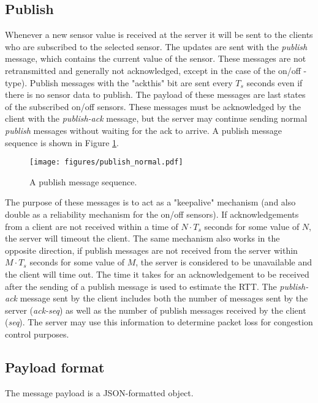 \documentclass[a4paper]{article}
\begin{document}
\subsection{Publish}
Whenever a new sensor value is received at the server it will be sent to the 
clients who are subscribed to the selected sensor. The updates are sent with
the \emph{publish} message, which contains the current value of the sensor.
These messages are not retransmitted and generally not acknowledged, except in the case of the on/off -type). Publish
messages with the "ackthis" bit are sent every $T_s$ seconds even if there
is no sensor data to publish. The payload of these messages are last states
of the subscribed on/off sensors. These messages must be acknowledged by the client 
with the \emph{publish-ack} message, but the server may continue sending normal \emph{publish} messages without waiting for the ack to arrive. A publish message
sequence is shown in Figure \ref{fig:pub_normal}.

\begin{figure}
	\centering
    \texttt{[image: figures/publish\_normal.pdf]}
    \caption{A publish message sequence.}
    \label{fig:pub_normal}
\end{figure}

The purpose of these messages is to act as a "keepalive" mechanism (and also double
as a reliability mechanism for the on/off sensors). If acknowledgements from a client
are not received within a time of $N \cdot T_s$ seconds for some value of $N$, the 
server will timeout the client. The same mechanism also works in the opposite 
direction, if publish messages are not received from the server within 
$M \cdot T_s$ seconds for some value of $M$,
the server is considered to be unavailable and the client will time out. The time it takes for an acknowledgement to be received after the sending of
a publish message is used to estimate the RTT.
The \emph{publish-ack} message sent by the client includes both the number of messages sent by the server (\emph{ack-seq}) as well as the number of publish messages received by the client (\emph{seq}).
The server may use this information to determine packet loss for congestion control purposes.

\subsection{Payload format}
\label{payload-format}

The message payload is a JSON-formatted object.
\end{document}
